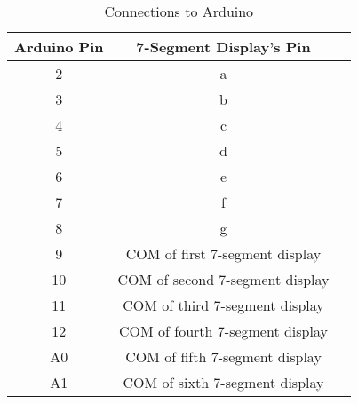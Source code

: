 \begin{table}[htbp]
\centering
\caption{Connections to Arduino}
\label{tab:connections}
\begin{tabular}{ccc}
\toprule
Arduino Pin & 7-Segment Display's Pin \\
\midrule
2 & a \\
3 & b \\
4 & c \\
5 & d \\
6 & e \\
7 & f \\
8 & g \\
9 & COM of first 7-segment display \\
10 & COM of second 7-segment display \\
11 & COM of third 7-segment display \\
12 & COM of fourth 7-segment display \\
A0 & COM of fifth 7-segment display \\
A1 & COM of sixth 7-segment display \\
\bottomrule
\end{tabular}
\end{table}

